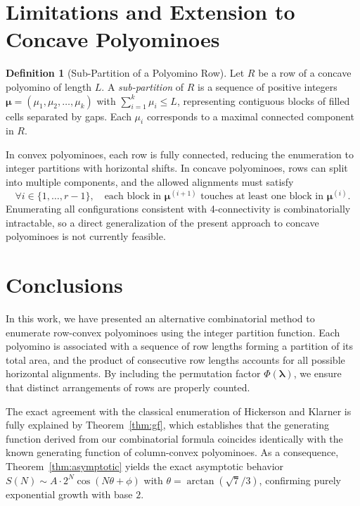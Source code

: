 \documentclass{article}
\theoremstyle{definition}
\newtheorem{definition}{Definition}[section]
\theoremstyle{plain}
\begin{document}
\section{Limitations and Extension to Concave Polyominoes}

\begin{definition}[Sub-Partition of a Polyomino Row]
Let $R$ be a row of a concave polyomino \cite{barequet2024totally} of 
length $L$. A \emph{sub-partition} of $R$ is a sequence of positive 
integers $\boldsymbol{\mu} = (\mu_1, \mu_2, \dots, \mu_k)$ with 
$\sum_{i=1}^{k} \mu_i \le L$, representing contiguous blocks of filled 
cells separated by gaps. Each $\mu_i$ corresponds to a maximal connected 
component in $R$.
\end{definition}

In convex polyominoes, each row is fully connected, reducing the 
enumeration to integer partitions with horizontal shifts. In concave 
polyominoes, rows can split into multiple components, and the allowed 
alignments must satisfy
\[
\forall i \in \{1, \dots, r-1\}, \quad 
\text{each block in } \boldsymbol{\mu}^{(i+1)} 
\text{ touches at least one block in } \boldsymbol{\mu}^{(i)}.
\]
Enumerating all configurations consistent with 4-connectivity is 
combinatorially intractable, so a direct generalization of the present 
approach to concave polyominoes is not currently feasible.

\section{Conclusions}

In this work, we have presented an alternative combinatorial method to 
enumerate row-convex polyominoes using the integer partition function. 
Each polyomino is associated with a sequence of row lengths forming a 
partition of its total area, and the product of consecutive row lengths 
accounts for all possible horizontal alignments. By including the 
permutation factor $\Phi(\boldsymbol{\lambda})$, we ensure that distinct 
arrangements of rows are properly counted.

The exact agreement with the classical enumeration of Hickerson 
\cite{hickerson1999counting} and Klarner \cite{klarner1965some} is fully 
explained by Theorem~\ref{thm:gf}, which establishes that the generating 
function derived from our combinatorial formula coincides identically with 
the known generating function of column-convex polyominoes. As a 
consequence, Theorem~\ref{thm:asymptotic} yields the exact asymptotic 
behavior $S(N) \sim A \cdot 2^N \cos(N\theta + \phi)$ with 
$\theta = \arctan(\sqrt{7}/3)$, confirming purely exponential growth with 
base $2$.
\end{document}
